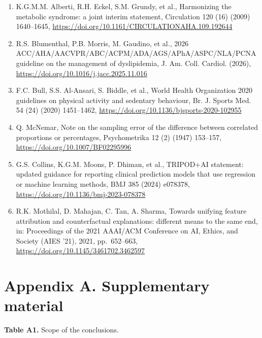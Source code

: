 \documentclass[
  11pt,
]{article}
\begin{document}
\begin{enumerate}
  S.M. Grundy, J.I. Cleeman, S.R. Daniels, et al., Diagnosis and
  management of the metabolic syndrome: an American Heart
  Association/\allowbreak{}National Heart, Lung, and Blood Institute
  scientific statement, Circulation 112 (17) (2005) 2735--2752,
  \url{https://doi.org/10.1161/CIRCULATIONAHA.105.169404}
\item
  K.G.M.M. Alberti, R.H. Eckel, S.M. Grundy, et al., Harmonizing the
  metabolic syndrome: a joint interim statement, Circulation 120 (16)
  (2009) 1640--1645,
  \url{https://doi.org/10.1161/CIRCULATIONAHA.109.192644}
\item
  R.S. Blumenthal, P.B. Morris, M. Gaudino, et al., 2026
  ACC/\allowbreak{}AHA/\allowbreak{}AACVPR/\allowbreak{}ABC/\allowbreak{}ACPM/\allowbreak{}ADA/\allowbreak{}AGS/\allowbreak{}APhA/\allowbreak{}ASPC/\allowbreak{}NLA/\allowbreak{}PCNA
  guideline on the management of dyslipidemia, J. Am. Coll. Cardiol.
  (2026), \url{https://doi.org/10.1016/j.jacc.2025.11.016}
\item
  F.C. Bull, S.S. Al-Ansari, S. Biddle, et al., World Health
  Organization 2020 guidelines on physical activity and sedentary
  behaviour, Br. J. Sports Med. 54 (24) (2020) 1451--1462,
  \url{https://doi.org/10.1136/bjsports-2020-102955}
\item
  Q. McNemar, Note on the sampling error of the difference between
  correlated proportions or percentages, Psychometrika 12 (2) (1947)
  153--157, \url{https://doi.org/10.1007/BF02295996}
\item
  G.S. Collins, K.G.M. Moons, P. Dhiman, et al., TRIPOD+AI statement:
  updated guidance for reporting clinical prediction models that use
  regression or machine learning methods, BMJ 385 (2024) e078378,
  \url{https://doi.org/10.1136/bmj-2023-078378}
\item
  R.K. Mothilal, D. Mahajan, C. Tan, A. Sharma, Towards unifying feature
  attribution and counterfactual explanations: different means to the
  same end, in: Proceedings of the 2021 AAAI/\allowbreak{}ACM Conference
  on AI, Ethics, and Society (AIES '21), 2021, pp.~652--663,
  \url{https://doi.org/10.1145/3461702.3462597}
\end{enumerate}

\clearpage

\section{Appendix A. Supplementary material}

\textbf{Table A1.} Scope of the conclusions.
\end{document}
